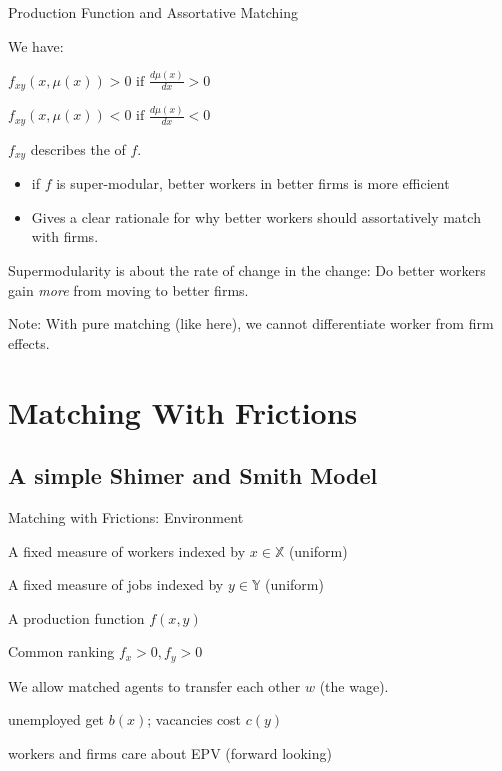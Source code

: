 \documentclass{beamer}%
\begin{document}
\begin{frame}{Production Function and Assortative Matching}
\begin{midi}
\item We have: 
\begin{mide}
\item {} $f_{xy}(x,\mu(x)) >0 \text{ if }\frac{d\mu(x)}{dx}>0$
\item {} $f_{xy}(x,\mu(x)) <0 \text{ if }\frac{d\mu(x)}{dx}<0$
\end{mide}
\item $f_{xy}$ describes the  of $f$.
\begin{itemize}
\item if $f$ is super-modular, better workers in better firms is more efficient
\item Gives a clear rationale for why better workers should assortatively match with firms.
\end{itemize}
\item Supermodularity is about the rate of change in the change: Do better workers gain \emph{more} from moving to better firms.
\item Note: With pure matching (like here), we cannot differentiate worker from firm effects.
\end{midi}
\end{frame}


\section{Matching With Frictions}
\begin{frame}
\tableofcontents[currentsection] 
\end{frame}

\subsection{A simple Shimer and Smith Model}


\begin{frame}{Matching with Frictions: Environment}
\begin{midi}
\item A fixed measure of workers indexed by $x \in \mathbb{X}$ (uniform)
\item A fixed measure of jobs indexed by $y \in \mathbb{Y}$ (uniform)
\item A production function $f(x,y)$
\item Common ranking $f_x>0, f_y>0$
\item We allow matched agents to transfer each other $w$ (the wage).
\item unemployed get $b(x)$; vacancies cost $c(y)$
\item workers and firms care about EPV (forward looking)
\end{midi}
\end{frame}
\end{document}
